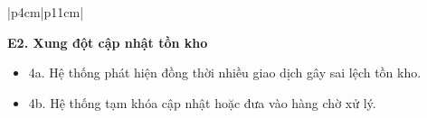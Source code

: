 \begin{longtable}{|p{4cm}|p{11cm}|}
\begin{minipage}[t]{\linewidth}
\vspace{0.3mm}

\textbf{E2. Xung đột cập nhật tồn kho}
\begin{itemize}
\item 4a. Hệ thống phát hiện đồng thời nhiều giao dịch gây sai lệch tồn kho.
\item 4b. Hệ thống tạm khóa cập nhật hoặc đưa vào hàng chờ xử lý.
\end{itemize}

\vspace{0.3mm}
\end{minipage}
\\ \hline

\end{longtable}

\renewcommand{\arraystretch}{1.2}

